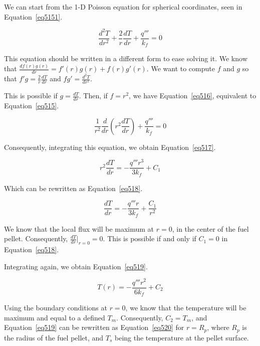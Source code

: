 We can start from the 1-D Poisson equation for spherical coordinates, seen in Equation~\ref{eq5151}.


\begin{equation}\label{eq5151}
\frac{d^2T}{dr^2} + \frac{2}{r}\frac{dT}{dr} + \frac{q'''}{k_f} = 0
\end{equation}

This equation should be written in a different form to ease solving it. We know that $\frac{df(r)g(r)}{dr} = f'(r)g(r) + f(r)g'(r)$. We want to compute $f$ and $g$ so that $f'g = \frac{2}{r}\frac{dT}{dr}$ and $fg' = \frac{d^2T}{dr^2}$.

This is possible if $g = \frac{dT}{dr}$. Then, if $f = r^2$, we have Equation~\ref{eq516}, equivalent to Equation~\ref{eq515}.


\begin{equation}\label{eq516}
\frac{1}{r^2}\frac{d}{dr}\left(r^2\frac{dT}{dr} \right) + \frac{q'''}{k_f} = 0
\end{equation}

Consequently, integrating this equation, we obtain Equation~\ref{eq517}.


\begin{equation}\label{eq517}
r^2\frac{dT}{dr} = - \frac{q'''r^3}{3k_f} + C_1
\end{equation}

Which can be rewritten as Equation~\ref{eq518}.

\begin{equation}\label{eq518}
\frac{dT}{dr} = - \frac{q'''r}{3k_f} + \frac{C_1}{r^2}
\end{equation}

We know that the local flux will be maximum at $r=0$, in the center of the fuel pellet. Consequently, $\frac{dT}{dr}\bigg\rvert_{r=0} = 0$. This is possible if and only if $C_1 = 0$ in Equation~\ref{eq518}.

Integrating again, we obtain Equation~\ref{eq519}.


\begin{equation}\label{eq519}
T(r) = - \frac{q'''r^2}{6k_f} + C_2
\end{equation}

Using the boundary conditions at $r=0$, we know that the temperature will be maximum and equal to a defined $T_m$. Consequently, $C_2 = T_m$, and Equation~\ref{eq519} can be rewritten as Equation~\ref{eq520} for $r=R_p$, where $R_p$ is the radius of the fuel pellet, and $T_s$ being the temperature at the pellet surface.


